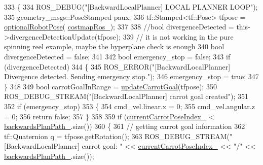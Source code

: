 \begin{DoxyCode}
333         \{
334             ROS\_DEBUG(\textcolor{stringliteral}{"[BackwardLocalPlanner] LOCAL PLANNER LOOP"});
335             geometry\_msgs::PoseStamped paux;
336             tf::Stamped<tf::Pose> tfpose = \hyperlink{namespacecl__move__base__z_1_1backward__local__planner_afd5bb2a0d144f7b89f4215fbcb1fbe69}{optionalRobotPose}(
      \hyperlink{classcl__move__base__z_1_1backward__local__planner_1_1BackwardLocalPlanner_a4136268882a105d9e06e173d85d5c0dc}{costmapRos\_});
337 
338             \textcolor{comment}{//bool divergenceDetected = this->divergenceDetectionUpdate(tfpose);}
339             \textcolor{comment}{// it is not working in the pure spinning reel example, maybe the hyperplane check is enough}
340             \textcolor{keywordtype}{bool} divergenceDetected = \textcolor{keyword}{false};
341 
342             \textcolor{keywordtype}{bool} emergency\_stop = \textcolor{keyword}{false};
343             \textcolor{keywordflow}{if} (divergenceDetected)
344             \{
345                 ROS\_ERROR(\textcolor{stringliteral}{"[BackwardLocalPlanner] Divergence detected. Sending emergency stop."});
346                 emergency\_stop = \textcolor{keyword}{true};
347             \}
348 
349             \textcolor{keywordtype}{bool} carrotGoalInRange = \hyperlink{classcl__move__base__z_1_1backward__local__planner_1_1BackwardLocalPlanner_a16e79a1b4c0f18879f6f0a8ba67103fd}{updateCarrotGoal}(tfpose);
350             ROS\_DEBUG\_STREAM(\textcolor{stringliteral}{"[BackwardLocalPlanner] carrot goal created"});
351 
352             \textcolor{keywordflow}{if} (emergency\_stop)
353             \{
354                 cmd\_vel.linear.x = 0;
355                 cmd\_vel.angular.z = 0;
356                 \textcolor{keywordflow}{return} \textcolor{keyword}{false};
357             \}
358 
359             \textcolor{keywordflow}{if} (\hyperlink{classcl__move__base__z_1_1backward__local__planner_1_1BackwardLocalPlanner_a2e8f2b78bc97f27c5fa431f3af2261ed}{currentCarrotPoseIndex\_} < 
      \hyperlink{classcl__move__base__z_1_1backward__local__planner_1_1BackwardLocalPlanner_ad9cde5c85f782cab2ddb4030e3c3f2cf}{backwardsPlanPath\_}.size())
360             \{
361                 \textcolor{comment}{// getting carrot goal information}
362                 tf::Quaternion q = tfpose.getRotation();
363                 ROS\_DEBUG\_STREAM(\textcolor{stringliteral}{"[BackwardLocalPlanner] carrot goal: "} << 
      \hyperlink{classcl__move__base__z_1_1backward__local__planner_1_1BackwardLocalPlanner_a2e8f2b78bc97f27c5fa431f3af2261ed}{currentCarrotPoseIndex\_} << \textcolor{stringliteral}{"/"} << \hyperlink{classcl__move__base__z_1_1backward__local__planner_1_1BackwardLocalPlanner_ad9cde5c85f782cab2ddb4030e3c3f2cf}{backwardsPlanPath\_}.size());

\end{DoxyCode}
